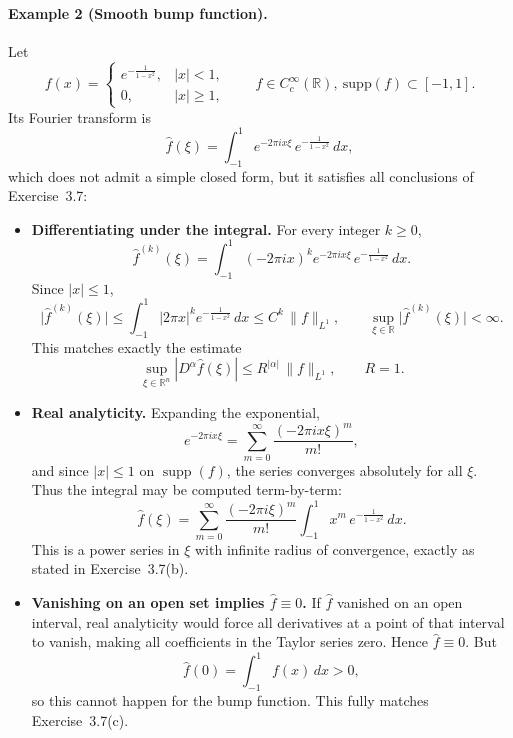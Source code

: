 \documentclass[12pt,a4paper]{article}
\theoremstyle{plain}
\theoremstyle{definition}
\theoremstyle{remark}
\theoremstyle{remark}
\begin{document}
\paragraph{Example 2 (Smooth bump function).}
Let
\[
f(x)=
\begin{cases}
	e^{-\frac{1}{1-x^{2}}}, & |x|<1,\\[0.3em]
	0, & |x|\ge 1 ,
\end{cases}
\qquad f\in C^\infty_c(\mathbb{R}),\ \mathrm{supp}(f)\subset[-1,1].
\]
Its Fourier transform is
\[
\widehat{f}(\xi)
= \int_{-1}^{1} e^{-2\pi i x\xi}\, e^{-\frac{1}{1-x^{2}}}\,dx,
\]
which does not admit a simple closed form, but it satisfies all conclusions of Exercise~3.7:

\begin{itemize}
	
	\item[(a)] \textbf{Differentiating under the integral.}
	For every integer $k\ge0$,
	\[
	\widehat{f}^{(k)}(\xi)
	= \int_{-1}^{1} (-2\pi i x)^{k} e^{-2\pi i x\xi}\, e^{-\frac{1}{1-x^{2}}}\,dx.
	\]
	Since $|x|\le 1$,
	\[
	\big|\widehat{f}^{(k)}(\xi)\big|
	\le \int_{-1}^{1} |2\pi x|^{k} e^{-\frac{1}{1-x^{2}}}\,dx
	\le C^{k}\,\|f\|_{L^{1}},
	\qquad
	\sup_{\xi\in\mathbb{R}}\big|\widehat{f}^{(k)}(\xi)\big| <\infty.
	\]
	This matches exactly the estimate
	\[
	\sup_{\xi\in\mathbb{R}^{n}} |D^\alpha \widehat{f}(\xi)|
	\le R^{|\alpha|}\,\|f\|_{L^{1}},
	\qquad R=1.
	\]
	
	\item[(b)] \textbf{Real analyticity.}
	Expanding the exponential,
	\[
	e^{-2\pi i x\xi}
	= \sum_{m=0}^{\infty} \frac{(-2\pi i x\xi)^{m}}{m!},
	\]
	and since $|x|\le 1$ on $\operatorname{supp}(f)$, the series converges absolutely for all $\xi$.
	Thus the integral may be computed term-by-term:
	\[
	\widehat{f}(\xi)
	= \sum_{m=0}^{\infty}
	\frac{(-2\pi i\xi)^{m}}{m!}
	\int_{-1}^{1} x^{m}\, e^{-\frac{1}{1-x^{2}}}\,dx.
	\]
	This is a power series in $\xi$ with infinite radius of convergence, exactly as stated in Exercise~3.7(b).
	
	\item[(c)] \textbf{Vanishing on an open set implies $\widehat{f}\equiv 0$.}
	If $\widehat{f}$ vanished on an open interval, real analyticity would force all derivatives
	at a point of that interval to vanish, making all coefficients in the Taylor series zero.
	Hence $\widehat{f}\equiv 0$.  
	But
	\[
	\widehat{f}(0)=\int_{-1}^{1} f(x)\,dx >0,
	\]
	so this cannot happen for the bump function.  
	This fully matches Exercise~3.7(c).
	
\end{itemize}
\end{document}

